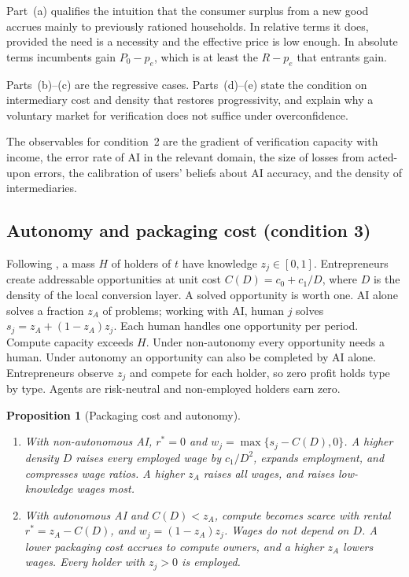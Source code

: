 \documentclass[12pt]{article}
\newtheorem{proposition}{Proposition}
\theoremstyle{remark}
\begin{document}
Part~(a) qualifies the intuition that the consumer surplus from a new good accrues mainly to previously rationed households. In relative terms it does, provided the need is a necessity and the effective price is low enough. In absolute terms incumbents gain $P_0-p_e$, which is at least the $R-p_e$ that entrants gain.

Parts~(b)--(c) are the regressive cases. Parts~(d)--(e) state the condition on intermediary cost and density that restores progressivity, and explain why a voluntary market for verification does not suffice under overconfidence.

The observables for condition~2 are the gradient of verification capacity with income, the error rate of AI in the relevant domain, the size of losses from acted-upon errors, the calibration of users' beliefs about AI accuracy, and the density of intermediaries.

\subsection{Autonomy and packaging cost (condition 3)}\label{sec:autonomy}

Following \citet{garicano2026comment}, a mass $H$ of holders of $t$ have knowledge $z_j\in[0,1]$. Entrepreneurs create addressable opportunities at unit cost $C(D)=c_0+c_1/D$, where $D$ is the density of the local conversion layer. A solved opportunity is worth one. AI alone solves a fraction $z_A$ of problems; working with AI, human $j$ solves $s_j=z_A+(1-z_A)z_j$. Each human handles one opportunity per period. Compute capacity exceeds $H$. Under non-autonomy every opportunity needs a human. Under autonomy an opportunity can also be completed by AI alone. Entrepreneurs observe $z_j$ and compete for each holder, so zero profit holds type by type. Agents are risk-neutral and non-employed holders earn zero.

\begin{proposition}[Packaging cost and autonomy]\label{prop:autonomy}
\begin{enumerate}[label=(\roman*),itemsep=0pt]
\item With non-autonomous AI, $r^*=0$ and $w_j=\max\{s_j-C(D),0\}$. A higher density $D$ raises every employed wage by $c_1/D^2$, expands employment, and compresses wage ratios. A higher $z_A$ raises all wages, and raises low-knowledge wages most.
\item With autonomous AI and $C(D)<z_A$, compute becomes scarce with rental $r^*=z_A-C(D)$, and $w_j=(1-z_A)z_j$. Wages do not depend on $D$. A lower packaging cost accrues to compute owners, and a higher $z_A$ lowers wages. Every holder with $z_j>0$ is employed.
\end{enumerate}
\end{proposition}
\end{document}
